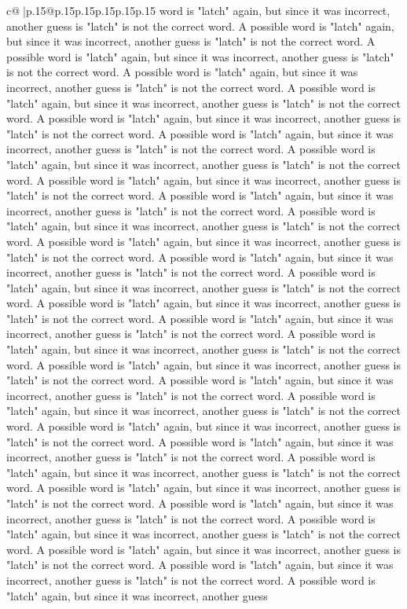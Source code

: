\documentclass{article}
\begin{document}
{\begin{supertabular}{c@{$\;$}|p{.15\linewidth}@{}p{.15\linewidth}p{.15\linewidth}p{.15\linewidth}p{.15\linewidth}p{.15\linewidth}}
{{{word is "latch" again, but since it was incorrect, another guess is "latch" is not the correct word. A possible word is "latch" again, but since it was incorrect, another guess is "latch" is not the correct word. A possible word is "latch" again, but since it was incorrect, another guess is "latch" is not the correct word. A possible word is "latch" again, but since it was incorrect, another guess is "latch" is not the correct word. A possible word is "latch" again, but since it was incorrect, another guess is "latch" is not the correct word. A possible word is "latch" again, but since it was incorrect, another guess is "latch" is not the correct word. A possible word is "latch" again, but since it was incorrect, another guess is "latch" is not the correct word. A possible word is "latch" again, but since it was incorrect, another guess is "latch" is not the correct word. A possible word is "latch" again, but since it was incorrect, another guess is "latch" is not the correct word. A possible word is "latch" again, but since it was incorrect, another guess is "latch" is not the correct word. A possible word is "latch" again, but since it was incorrect, another guess is "latch" is not the correct word. A possible word is "latch" again, but since it was incorrect, another guess is "latch" is not the correct word. A possible word is "latch" again, but since it was incorrect, another guess is "latch" is not the correct word. A possible word is "latch" again, but since it was incorrect, another guess is "latch" is not the correct word. A possible word is "latch" again, but since it was incorrect, another guess is "latch" is not the correct word. A possible word is "latch" again, but since it was incorrect, another guess is "latch" is not the correct word. A possible word is "latch" again, but since it was incorrect, another guess is "latch" is not the correct word. A possible word is "latch" again, but since it was incorrect, another guess is "latch" is not the correct word. A possible word is "latch" again, but since it was incorrect, another guess is "latch" is not the correct word. A possible word is "latch" again, but since it was incorrect, another guess is "latch" is not the correct word. A possible word is "latch" again, but since it was incorrect, another guess is "latch" is not the correct word. A possible word is "latch" again, but since it was incorrect, another guess is "latch" is not the correct word. A possible word is "latch" again, but since it was incorrect, another guess is "latch" is not the correct word. A possible word is "latch" again, but since it was incorrect, another guess is "latch" is not the correct word. A possible word is "latch" again, but since it was incorrect, another guess is "latch" is not the correct word. A possible word is "latch" again, but since it was incorrect, another guess is "latch" is not the correct word. A possible word is "latch" again, but since it was incorrect, another guess is "latch" is not the correct word. A possible word is "latch" again, but since it was incorrect, another guess is "latch" is not the correct word. A possible word is "latch" again, but since it was incorrect, another guess }}}
\end{supertabular}}
\end{document}
